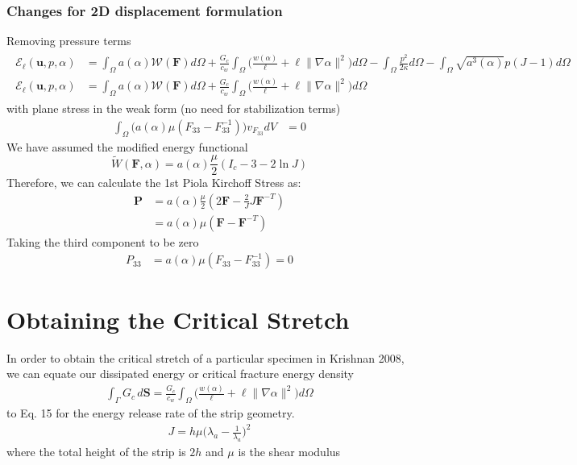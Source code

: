 \documentclass[12pt,3p]{article}
\numberwithin{equation}{section}
\begin{document}
\subsubsection{Changes for 2D displacement formulation}
Removing pressure terms
\begin{align*}
\begin{split}
\mathcal{E}_{\ell}\left(\boldsymbol{u}, p, \alpha\right) &= \int_{\Omega} a(\alpha) \mathcal{W}(\mathbf{F}) d \Omega + \frac{G_{c}}{c_{w}} \int_{\Omega} \bigg(\frac{w(\alpha)}{\ell}+\ell\|\nabla \alpha\|^{2} \bigg) d \Omega- \int_{\Omega} \frac{p^{2}}{2 \kappa} d \Omega - \int_{\Omega} \sqrt{a^{3}(\alpha)} p(J-1) d \Omega \\
\mathcal{E}_{\ell}\left(\boldsymbol{u}, p, \alpha\right) &= \int_{\Omega} a(\alpha) \mathcal{W}(\mathbf{F}) d \Omega + \frac{G_{c}}{c_{w}} \int_{\Omega} \bigg(\frac{w(\alpha)}{\ell}+\ell\|\nabla \alpha\|^{2} \bigg) d \Omega
\end{split}
\end{align*}
with plane stress in the weak form (no need for stabilization terms)
\begin{align*}
\int_{\Omega} \big( a(\alpha) \mu (F_{33} - F_{33}^{-1}) \big) v_{F_{33}} dV &= 0
\end{align*}
We have assumed the modified energy functional
\begin{equation}
\widetilde{W} (\mathbf{F}, \alpha) = a (\alpha) \frac{\mu}{2} (I_c - 3 - 2 \ln J) 
\end{equation}
Therefore, we can calculate the 1st Piola Kirchoff Stress as:
\begin{align*}
\mathbf{P} &= a (\alpha) \frac{\mu}{2} (2 \mathbf{F} - \frac{2}{J} J \mathbf{F}^{-T}) \\
		&= a (\alpha) \mu (\mathbf{F} - \mathbf{F}^{-T})
\end{align*}
Taking the third component to be zero
\begin{align*}
P_{33} &= a(\alpha) \mu (F_{33} - F_{33}^{-1}) = 0 
\end{align*}

\newpage

\section{Obtaining the Critical Stretch}
In order to obtain the critical stretch of a particular specimen in Krishnan 2008, we can equate our dissipated energy or critical fracture energy density
\begin{align*}
\int_{\Gamma} G_c \, d \mathbf{S} = \frac{G_{c}}{c_{w}} \int_{\Omega} \bigg(\frac{w(\alpha)}{\ell}+\ell\|\nabla \alpha\|^{2} \bigg) d \Omega
\end{align*}
to Eq. 15 for the energy release rate of the strip geometry.
\begin{align*}
J = h \mu \bigg( \lambda_a - \frac{1}{\lambda_a} \bigg)^2
\end{align*}
where the total height of the strip is $2h$ and $\mu$ is the shear modulus 
\end{document}
